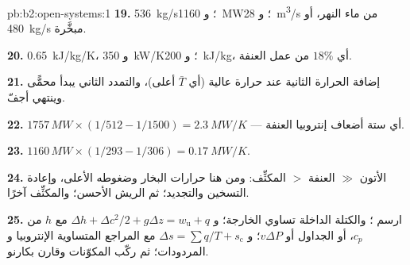 \begin{solution}{pb:b2:open-systems:1}
\textbf{19.} \qty{536}{kg/s}؛ و \qty{1160}{MW}؛ و \qty{28}{m^3/s} من ماء النهر،
أو \qty{480}{kg/s} مبخَّرة.

\textbf{20.} \qty{0.65}{kJ/kg/K}، و \qty{350}{kW/K}؛ و \qty{200}{kJ/kg}، أي $18\%$ من
عمل العنفة.

\textbf{21.} إضافة الحرارة الثانية عند حرارة عالية (أي $\bar T$
أعلى)، والتمدد الثاني يبدأ محمًّى وينتهي أجفّ.

\textbf{22.} $1757\,\unit{MW} \times (1/512 - 1/1500) = \qty{2.3}{MW/K}$ --- أي ستة أضعاف
إنتروبيا العنفة.

\textbf{23.} $1160\,\unit{MW} \times (1/293 - 1/306) = \qty{0.17}{MW/K}$.

\textbf{24.} الأتون $\gg$ العنفة $>$ المكثِّف: ومن هنا حرارات
البخار وضغوطه الأعلى، وإعادة التسخين والتجديد؛ ثم الريش
الأحسن؛ والمكثِّف آخرًا.

\textbf{25.} ارسم ؛ والكتلة الداخلة تساوي الخارجة؛ و $\Delta h +
\Delta c^2/2 + g\Delta z = w_{\text{u}} + q$ مع $h$ من $c_p$، أو الجداول أو
$v\Delta P$؛ و $\Delta s = \sum q/T + s_{\text{c}}$ مع المراجع المتساوية الإنتروبيا و
المردودات؛ ثم ركّب المكوّنات وقارن بكارنو.
\end{solution}
